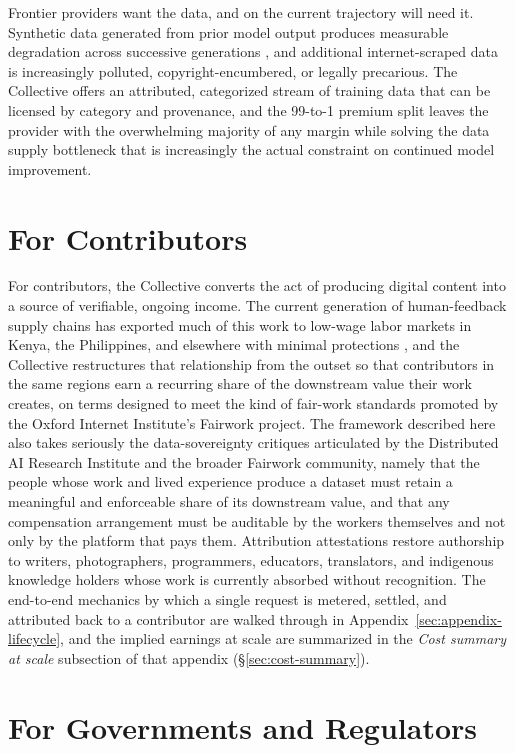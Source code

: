 \documentclass[10pt,a4paper,twocolumn]{article}
\begin{document}
Frontier providers want the data, and on the current trajectory will need it. Synthetic data generated from prior model output produces measurable degradation across successive generations \citep{shumailov2024modelcollapse}, and additional internet-scraped data is increasingly polluted, copyright-encumbered, or legally precarious. The Collective offers an attributed, categorized stream of training data that can be licensed by category and provenance, and the 99-to-1 premium split leaves the provider with the overwhelming majority of any margin while solving the data supply bottleneck that is increasingly the actual constraint on continued model improvement.

\section{For Contributors}
\label{sec:why-people}

For contributors, the Collective converts the act of producing digital content into a source of verifiable, ongoing income. The current generation of human-feedback supply chains has exported much of this work to low-wage labor markets in Kenya, the Philippines, and elsewhere with minimal protections \citep[ch.~9]{hao2025empire}, and the Collective restructures that relationship from the outset so that contributors in the same regions earn a recurring share of the downstream value their work creates, on terms designed to meet the kind of fair-work standards promoted by the Oxford Internet Institute's Fairwork project. The framework described here also takes seriously the data-sovereignty critiques articulated by the Distributed AI Research Institute and the broader Fairwork community, namely that the people whose work and lived experience produce a dataset must retain a meaningful and enforceable share of its downstream value, and that any compensation arrangement must be auditable by the workers themselves and not only by the platform that pays them. Attribution attestations restore authorship to writers, photographers, programmers, educators, translators, and indigenous knowledge holders whose work is currently absorbed without recognition. The end-to-end mechanics by which a single request is metered, settled, and attributed back to a contributor are walked through in Appendix~\ref{sec:appendix-lifecycle}, and the implied earnings at scale are summarized in the \emph{Cost summary at scale} subsection of that appendix (\S\ref{sec:cost-summary}).

\section{For Governments and Regulators}
\label{sec:why-gov}
\end{document}
